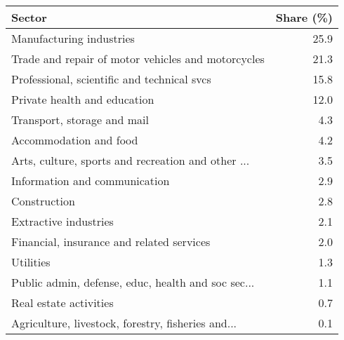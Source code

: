 \begin{tabular}{lr}
\toprule
                                            Sector &  Share (\%) \\
\midrule
                          Manufacturing industries &       25.9 \\
Trade and repair of motor vehicles and motorcycles &       21.3 \\
       Professional, scientific and technical svcs &       15.8 \\
                      Private health and education &       12.0 \\
                       Transport, storage and mail &        4.3 \\
                            Accommodation and food &        4.2 \\
Arts, culture, sports and recreation and other ... &        3.5 \\
                     Information and communication &        2.9 \\
                                      Construction &        2.8 \\
                             Extractive industries &        2.1 \\
         Financial, insurance and related services &        2.0 \\
                                         Utilities &        1.3 \\
Public admin, defense, educ, health and soc sec... &        1.1 \\
                            Real estate activities &        0.7 \\
Agriculture, livestock, forestry, fisheries and... &        0.1 \\
\bottomrule
\end{tabular}
